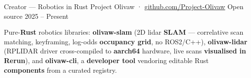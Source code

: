 
\begin{cventries}

  \cventry
  {Creator --- Robotics in Rust}
  {Project Olivaw · \href{https://github.com/Project-Olivaw}{github.com/Project-Olivaw}}
  {Open source}
  {2025 -- Present}
  {
    \begin{cvitems}
      \item {Pure-\textbf{Rust} robotics libraries: \textbf{olivaw-slam} (2D lidar \textbf{SLAM} --- correlative scan matching, keyframing, log-odds \textbf{occupancy grid}, no ROS2/C++), \textbf{olivaw-lidar} (RPLIDAR driver cross-compiled to \textbf{aarch64} hardware, live scans \textbf{visualised in Rerun}), and \textbf{olivaw-cli}, a \textbf{developer tool} vendoring editable Rust \textbf{components} from a curated registry.}
    \end{cvitems}
  }

\end{cventries}

